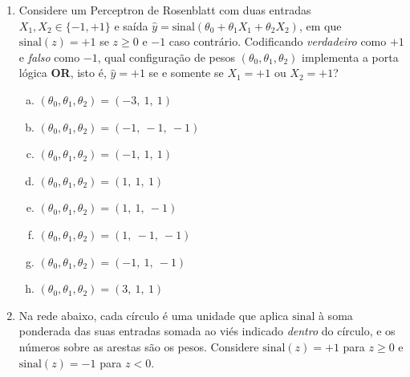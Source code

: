 \documentclass{dlproblemset}
\begin{document}
\begin{enumerate}[1)]
    \item Considere um Perceptron de Rosenblatt com duas entradas $X_1, X_2 \in \{-1, +1\}$ e saída $\hat{y} = \mathrm{sinal}(\theta_0 + \theta_1 X_1 + \theta_2 X_2)$, em que $\mathrm{sinal}(z) = +1$ se $z \geq 0$ e $-1$ caso contrário. Codificando \emph{verdadeiro} como $+1$ e \emph{falso} como $-1$, qual configuração de pesos $(\theta_0, \theta_1, \theta_2)$ implementa a porta lógica \textbf{OR}, isto é, $\hat{y} = +1$ se e somente se $X_1 = +1$ ou $X_2 = +1$?
    \begin{enumerate}[(a)]
        \item $(\theta_0, \theta_1, \theta_2) = (-3,\ 1,\ 1)$
        \item $(\theta_0, \theta_1, \theta_2) = (-1,\ -1,\ -1)$
        \item $(\theta_0, \theta_1, \theta_2) = (-1,\ 1,\ 1)$
        \item $(\theta_0, \theta_1, \theta_2) = (1,\ 1,\ 1)$
        \item $(\theta_0, \theta_1, \theta_2) = (1,\ 1,\ -1)$
        \item $(\theta_0, \theta_1, \theta_2) = (1,\ -1,\ -1)$
        \item $(\theta_0, \theta_1, \theta_2) = (-1,\ 1,\ -1)$
        \item $(\theta_0, \theta_1, \theta_2) = (3,\ 1,\ 1)$
    \end{enumerate}

    \item Na rede abaixo, cada círculo é uma unidade que aplica $\mathrm{sinal}$ à soma ponderada das suas entradas somada ao viés indicado \emph{dentro} do círculo, e os números sobre as arestas são os pesos. Considere $\mathrm{sinal}(z) = +1$ para $z \geq 0$ e $\mathrm{sinal}(z) = -1$ para $z < 0$.

    \begin{center}
    \end{center}


\end{enumerate}
\end{document}
